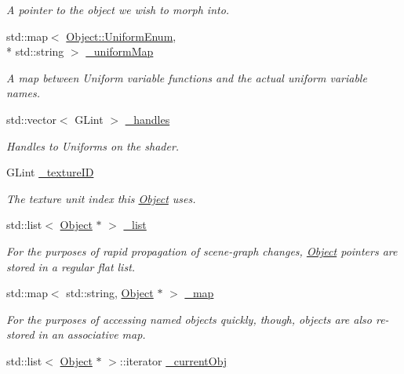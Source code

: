 \begin{DoxyCompactItemize}
\begin{DoxyCompactList}\small\item\em A pointer to the object we wish to morph into. \end{DoxyCompactList}\item 
std\-::map$<$ \hyperlink{class_object_a79b74057dbc5182b85c9c3ba8480fcf2}{Object\-::\-Uniform\-Enum}, \\*
std\-::string $>$ \hyperlink{class_object_a6378d0b0eeec23045ae2a5245e42bf13}{\-\_\-uniform\-Map}
\begin{DoxyCompactList}\small\item\em A map between Uniform variable functions and the actual uniform variable names. \end{DoxyCompactList}\item 
std\-::vector$<$ G\-Lint $>$ \hyperlink{class_object_a983963f564898beca4bda99676245663}{\-\_\-handles}
\begin{DoxyCompactList}\small\item\em Handles to Uniforms on the shader. \end{DoxyCompactList}\item 
\hypertarget{class_object_aefef7502dd10fb3c1c266cf688c432de}{G\-Lint \hyperlink{class_object_aefef7502dd10fb3c1c266cf688c432de}{\-\_\-texture\-I\-D}}\label{class_object_aefef7502dd10fb3c1c266cf688c432de}

\begin{DoxyCompactList}\small\item\em The texture unit index this \hyperlink{class_object}{Object} uses. \end{DoxyCompactList}\item 
\hypertarget{class_scene_acdd0123ca6b2d64d8d447bb485b235fc}{std\-::list$<$ \hyperlink{class_object}{Object} $\ast$ $>$ \hyperlink{class_scene_acdd0123ca6b2d64d8d447bb485b235fc}{\-\_\-list}}\label{class_scene_acdd0123ca6b2d64d8d447bb485b235fc}

\begin{DoxyCompactList}\small\item\em For the purposes of rapid propagation of scene-\/graph changes, \hyperlink{class_object}{Object} pointers are stored in a regular flat list. \end{DoxyCompactList}\item 
std\-::map$<$ std\-::string, \hyperlink{class_object}{Object} $\ast$ $>$ \hyperlink{class_scene_a8bd5d86484a12255b26b92b6cbf8d29a}{\-\_\-map}
\begin{DoxyCompactList}\small\item\em For the purposes of accessing named objects quickly, though, objects are also re-\/stored in an associative map. \end{DoxyCompactList}\item 
\hypertarget{class_scene_ae87ca5350fcc595f3f15a4fd3c39f3d9}{std\-::list$<$ \hyperlink{class_object}{Object} $\ast$ $>$\-::iterator \hyperlink{class_scene_ae87ca5350fcc595f3f15a4fd3c39f3d9}{\-\_\-current\-Obj}}\label{class_scene_ae87ca5350fcc595f3f15a4fd3c39f3d9}


\end{DoxyCompactItemize}
